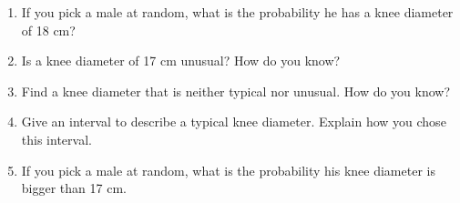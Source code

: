 \begin{enumerate}
\item If you pick a male at random, what is the probability he has a knee diameter of 18 cm?\\[.5cm]
\item Is a knee diameter of 17 cm unusual? How do you know?\\[.5cm]
\item Find a knee diameter that is neither typical nor unusual. How do you know?\\[.5cm]
\item Give an interval to describe a typical knee diameter. Explain how you chose this interval.\\[.5cm]
\item If you pick a male at random, what is the probability his knee diameter is bigger than 17 cm.\\[.5cm]
\end{enumerate}


